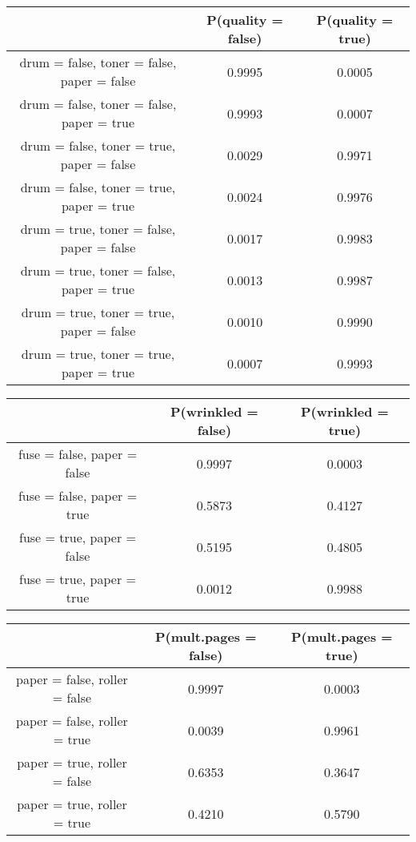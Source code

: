 \begin{table}[h!]
	\begin{tabular}{|c|c|c|}
		\hline
		& P(quality = false) & P(quality = true) \\ \hline
		drum = false, toner = false, paper = false & 0.9995 & 0.0005 \\ \hline
		drum = false, toner = false, paper = true & 0.9993 & 0.0007 \\ \hline
		drum = false, toner = true, paper = false & 0.0029 & 0.9971 \\ \hline
		drum = false, toner = true, paper = true & 0.0024 & 0.9976 \\ \hline
		drum = true, toner = false, paper = false & 0.0017 & 0.9983 \\ \hline
		drum = true, toner = false, paper = true & 0.0013 & 0.9987 \\ \hline
		drum = true, toner = true, paper = false & 0.0010 & 0.9990 \\ \hline
		drum = true, toner = true, paper = true & 0.0007 & 0.9993 \\ \hline
	\end{tabular}
\end{table}

\begin{table}[h!]
	\begin{tabular}{|c|c|c|}
		\hline
		& P(wrinkled = false) & P(wrinkled = true) \\ \hline
		fuse = false, paper = false & 0.9997 & 0.0003 \\ \hline
		fuse = false, paper = true & 0.5873 & 0.4127 \\ \hline
		fuse = true, paper = false & 0.5195 & 0.4805 \\ \hline
		fuse = true, paper = true & 0.0012 & 0.9988 \\ \hline
	\end{tabular}
\end{table}

\begin{table}[h!]
	\begin{tabular}{|c|c|c|}
		\hline
		& P(mult.pages = false) & P(mult.pages = true) \\ \hline
		paper = false, roller = false & 0.9997 & 0.0003 \\ \hline
		paper = false, roller = true & 0.0039 & 0.9961 \\ \hline
		paper = true, roller = false & 0.6353 & 0.3647 \\ \hline
		paper = true, roller = true & 0.4210 & 0.5790 \\ \hline
	\end{tabular}
\end{table}

